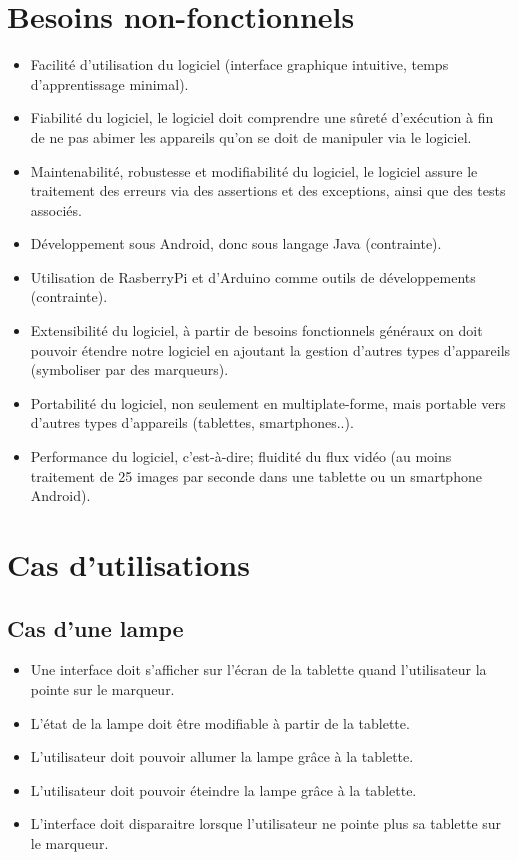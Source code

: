 \documentclass[12pt,a4paper]{article}
\begin{document}
\section{Besoins non-fonctionnels}
\begin{itemize}
  \item Facilité d'utilisation du logiciel (interface graphique intuitive, temps d'apprentissage minimal).
  \item Fiabilité du logiciel, le logiciel doit comprendre une sûreté d'exécution à fin de ne pas abimer les appareils qu'on se doit de manipuler via le logiciel.
  \item Maintenabilité, robustesse et modifiabilité du logiciel, le logiciel assure le traitement des erreurs via des assertions et des exceptions, ainsi que des tests associés.
  \item Développement sous Android, donc sous langage Java (contrainte).
  \item Utilisation de RasberryPi et d'Arduino comme outils de développements (contrainte).
  \item Extensibilité du logiciel, à partir de besoins fonctionnels généraux on doit pouvoir étendre notre logiciel en ajoutant la gestion d'autres types d'appareils (symboliser par des marqueurs).
  \item Portabilité du logiciel, non seulement en multiplate-forme, mais portable vers d'autres types d'appareils (tablettes, smartphones..).
  \item Performance du logiciel, c'est-à-dire; fluidité du flux vidéo (au moins traitement de 25 images par seconde dans une tablette ou un smartphone Android).
\end{itemize}

\section{Cas d'utilisations}
\subsection{Cas d'une lampe}

\begin{itemize}
  \item Une interface doit s'afficher sur l'écran de la tablette quand l'utilisateur la pointe sur le marqueur.
  \item L'état de la lampe doit être modifiable à partir de la tablette.
  \item L'utilisateur doit pouvoir allumer la lampe grâce à la tablette.
  \item L'utilisateur doit pouvoir éteindre la lampe grâce à la tablette.
  \item L'interface doit disparaitre lorsque l'utilisateur ne pointe plus sa tablette sur le marqueur.
\end{itemize}
\end{document}
